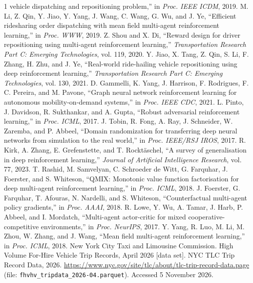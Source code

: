 \documentclass[conference]{IEEEtran}
\begin{document}
\begin{thebibliography}{1}
vehicle dispatching and repositioning problem,'' in \emph{Proc. IEEE ICDM},
2019.
 M. Li, Z. Qin, Y. Jiao, Y. Yang, J. Wang, C. Wang, G. Wu,
and J. Ye, ``Efficient ridesharing order dispatching with mean field
multi-agent reinforcement learning,'' in \emph{Proc. WWW}, 2019.
 Z. Shou and X. Di, ``Reward design for driver
repositioning using multi-agent reinforcement learning,'' \emph{Transportation
Research Part C: Emerging Technologies}, vol. 119, 2020.
 Y. Jiao, X. Tang, Z. Qin, S. Li, F. Zhang, H. Zhu, and J.
Ye, ``Real-world ride-hailing vehicle repositioning using deep reinforcement
learning,'' \emph{Transportation Research Part C: Emerging Technologies},
vol. 130, 2021.
 D. Gammelli, K. Yang, J. Harrison, F. Rodrigues, F. C.
Pereira, and M. Pavone, ``Graph neural network reinforcement learning for
autonomous mobility-on-demand systems,'' in \emph{Proc. IEEE CDC}, 2021.
 L. Pinto, J. Davidson, R. Sukthankar, and A. Gupta,
``Robust adversarial reinforcement learning,'' in \emph{Proc. ICML}, 2017.
 J. Tobin, R. Fong, A. Ray, J. Schneider, W. Zaremba, and
P. Abbeel, ``Domain randomization for transferring deep neural networks from
simulation to the real world,'' in \emph{Proc. IEEE/RSJ IROS}, 2017.
 R. Kirk, A. Zhang, E. Grefenstette, and T. Rockt\"aschel,
``A survey of generalisation in deep reinforcement learning,'' \emph{Journal
of Artificial Intelligence Research}, vol. 77, 2023.
 T. Rashid, M. Samvelyan, C. Schroeder de Witt, G.
Farquhar, J. Foerster, and S. Whiteson, ``QMIX: Monotonic value function
factorisation for deep multi-agent reinforcement learning,'' in \emph{Proc.
ICML}, 2018.
 J. Foerster, G. Farquhar, T. Afouras, N. Nardelli, and
S. Whiteson, ``Counterfactual multi-agent policy gradients,'' in \emph{Proc.
AAAI}, 2018.
 R. Lowe, Y. Wu, A. Tamar, J. Harb, P. Abbeel, and I.
Mordatch, ``Multi-agent actor-critic for mixed cooperative-competitive
environments,'' in \emph{Proc. NeurIPS}, 2017.
 Y. Yang, R. Luo, M. Li, M. Zhou, W. Zhang, and J. Wang,
``Mean field multi-agent reinforcement learning,'' in \emph{Proc. ICML}, 2018.
 New York City Taxi and Limousine Commission.
\newblock High Volume For-Hire Vehicle Trip Records, April 2026 [data set].
\newblock NYC TLC Trip Record Data, 2026.
\newblock \url{https://www.nyc.gov/site/tlc/about/tlc-trip-record-data.page}
  (file: \texttt{fhvhv\_tripdata\_2026-04.parquet}).
\newblock Accessed 5 November 2026.
\end{thebibliography}
\end{document}
